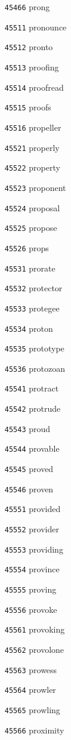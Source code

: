 \documentclass[twoside,11pt]{article}
\begin{document}
\begin{multicols}{5}
\begin{enumerate}
\item[\texttt{45466}] prong
\item[\texttt{45511}] pronounce
\item[\texttt{45512}] pronto
\item[\texttt{45513}] proofing
\item[\texttt{45514}] proofread
\item[\texttt{45515}] proofs
\item[\texttt{45516}] propeller
\item[\texttt{45521}] properly
\item[\texttt{45522}] property
\item[\texttt{45523}] proponent
\item[\texttt{45524}] proposal
\item[\texttt{45525}] propose
\item[\texttt{45526}] props
\item[\texttt{45531}] prorate
\item[\texttt{45532}] protector
\item[\texttt{45533}] protegee
\item[\texttt{45534}] proton
\item[\texttt{45535}] prototype
\item[\texttt{45536}] protozoan
\item[\texttt{45541}] protract
\item[\texttt{45542}] protrude
\item[\texttt{45543}] proud
\item[\texttt{45544}] provable
\item[\texttt{45545}] proved
\item[\texttt{45546}] proven
\item[\texttt{45551}] provided
\item[\texttt{45552}] provider
\item[\texttt{45553}] providing
\item[\texttt{45554}] province
\item[\texttt{45555}] proving
\item[\texttt{45556}] provoke
\item[\texttt{45561}] provoking
\item[\texttt{45562}] provolone
\item[\texttt{45563}] prowess
\item[\texttt{45564}] prowler
\item[\texttt{45565}] prowling
\item[\texttt{45566}] proximity

\end{enumerate}
\end{multicols}
\end{document}
